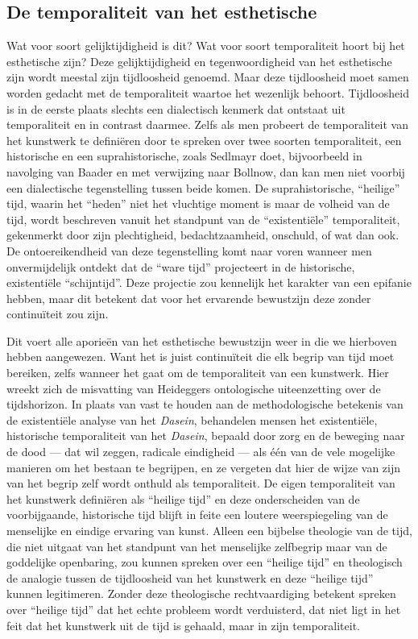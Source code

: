 \subsection{De temporaliteit van het esthetische}

Wat voor soort gelijktijdigheid is dit? Wat voor soort temporaliteit hoort bij het esthetische zijn? Deze gelijktijdigheid en tegenwoordigheid van het esthetische zijn wordt meestal zijn tijdloosheid genoemd. Maar deze tijdloosheid moet samen worden gedacht met de temporaliteit waartoe het wezenlijk behoort. Tijdloosheid is in de eerste plaats slechts een dialectisch kenmerk dat ontstaat uit temporaliteit en in contrast daarmee. Zelfs als men probeert de temporaliteit van het kunstwerk te definiëren door te spreken over twee soorten temporaliteit, een historische en een suprahistorische, zoals Sedlmayr doet, bijvoorbeeld in navolging van Baader en met verwijzing naar Bollnow, dan kan men niet voorbij een dialectische tegenstelling tussen beide komen. De suprahistorische, ``heilige'' tijd, waarin het ``heden'' niet het vluchtige moment is maar de volheid van de tijd, wordt beschreven vanuit het standpunt van de ``existentiële'' temporaliteit, gekenmerkt door zijn plechtigheid, bedachtzaamheid, onschuld, of wat dan ook. De ontoereikendheid van deze tegenstelling komt naar voren wanneer men onvermijdelijk ontdekt dat de ``ware tijd'' projecteert in de historische, existentiële ``schijntijd''. Deze projectie zou kennelijk het karakter van een epifanie hebben, maar dit betekent dat voor het ervarende bewustzijn deze zonder continuïteit zou zijn.

Dit voert alle aporieën van het esthetische bewustzijn weer in die we hierboven hebben aangewezen. Want het is juist continuïteit die elk begrip van tijd moet bereiken, zelfs wanneer het gaat om de temporaliteit van een kunstwerk. Hier wreekt zich de misvatting van Heideggers ontologische uiteenzetting over de tijdshorizon. In plaats van vast te houden aan de methodologische betekenis van de existentiële analyse van het \textit{Dasein}, behandelen mensen het existentiële, historische temporaliteit van het \textit{Dasein}, bepaald door zorg en de beweging naar de dood — dat wil zeggen, radicale eindigheid — als één van de vele mogelijke manieren om het bestaan te begrijpen, en ze vergeten dat hier de wijze van zijn van het begrip zelf wordt onthuld als temporaliteit. De eigen temporaliteit van het kunstwerk definiëren als ``heilige tijd'' en deze onderscheiden van de voorbijgaande, historische tijd blijft in feite een loutere weerspiegeling van de menselijke en eindige ervaring van kunst. Alleen een bijbelse theologie van de tijd, die niet uitgaat van het standpunt van het menselijke zelfbegrip maar van de goddelijke openbaring, zou kunnen spreken over een ``heilige tijd'' en theologisch de analogie tussen de tijdloosheid van het kunstwerk en deze ``heilige tijd'' kunnen legitimeren. Zonder deze theologische rechtvaardiging betekent spreken over ``heilige tijd'' dat het echte probleem wordt verduisterd, dat niet ligt in het feit dat het kunstwerk uit de tijd is gehaald, maar in zijn temporaliteit.

